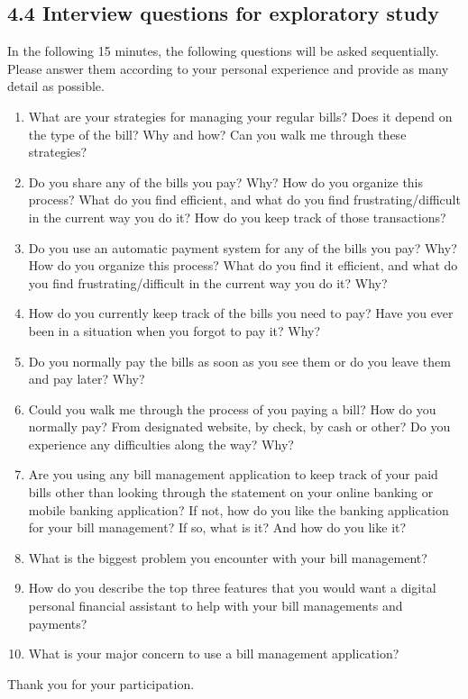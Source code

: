\documentclass{sigchi}
\begin{document}
\subsection{4.4 Interview questions for exploratory study}
In the following 15 minutes, the following questions will be asked sequentially. Please answer them according to your personal experience and provide as many detail as possible.
\begin{enumerate}
    \item What are your strategies for managing your regular bills? Does it depend on the type of the bill? Why and how? Can you walk me through these strategies?
    \item Do you share any of the bills you pay? Why? How do you organize this process? What do you find efficient, and what do you find frustrating/difficult in the current way you do it? How do you keep track of those transactions?
    \item Do you use an automatic payment system for any of the bills you pay? Why? How do you organize this process? What do you find it efficient, and what do you find frustrating/difficult in the current way you do it? Why? 
    \item How do you currently keep track of the bills you need to pay? Have you ever been in a situation when you forgot to pay it? Why?
    \item Do you normally pay the bills as soon as you see them or do you leave them and pay later? Why?
    \item Could you walk me through the process of you paying a bill? How do you normally pay? From designated website, by check, by cash or other? Do you experience any difficulties along the way? Why?
    \item Are you using any bill management application to keep track of your paid bills other than looking through the statement on your online banking or mobile banking application? If not, how do you like the banking application for your bill management? If so, what is it? And how do you like it?
    \item What is the biggest problem you encounter with your bill management?
    \item How do you describe the top three features that you would want a digital personal financial assistant to help with your bill managements and payments?
    \item What is your major concern to use a bill management application?

\end{enumerate}
Thank you for your participation.
\end{document}
